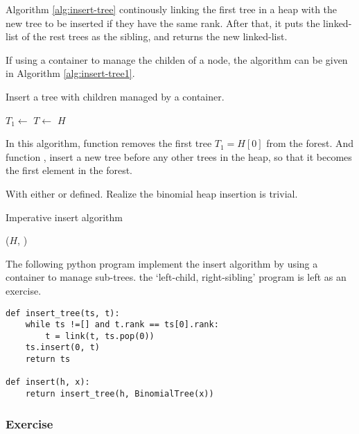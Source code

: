 \documentclass{article}
\begin{document}
Algorithm \ref{alg:insert-tree} continously linking the first tree
in a heap with the new tree to be inserted if they have the same rank.
After that, it puts the linked-list of the rest trees as the sibling,
and returns the new linked-list.

If using a container to manage the childen of a node, the algorithm
can be given in Algorithm \ref{alg:insert-tree1}.

\begin{algorithm}
\caption{Insert a tree with children managed by a container.}
\label{alg:insert-tree1}
\begin{algorithmic}[1]
    \State $T_1 \gets$ 
    \State $T \gets $ 
  \EndWhile
  \State {}
  \State \Return $H$
\EndFunction
\end{algorithmic}
\end{algorithm}

In this algorithm, function  removes the first tree
$T_1 = H[0]$ from the forest. And function ,
insert a new tree before any other trees in the heap, so that it 
becomes the first element in the forest.

With either  or  defined.
Realize the binomial heap insertion is trivial.

\begin{algorithm}
\caption{Imperative insert algorithm}
\label{alg:bheap-insert}
\begin{algorithmic}[1]
  \State \Return {}($H$, )
\EndFunction
\end{algorithmic}
\end{algorithm}

The following python program implement the insert algorithm by using
a container to manage sub-trees. the `left-child, right-sibling' program
is left as an exercise.

\lstset{language=Python}
\begin{lstlisting}
def insert_tree(ts, t):
    while ts !=[] and t.rank == ts[0].rank:
        t = link(t, ts.pop(0))
    ts.insert(0, t)
    return ts

def insert(h, x):
    return insert_tree(h, BinomialTree(x))
\end{lstlisting}

\subsubsection*{Exercise}
\end{document}
